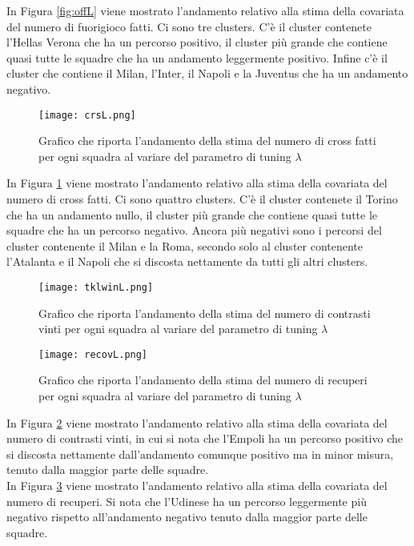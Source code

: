 In Figura \ref{fig:offL} viene mostrato l'andamento relativo alla stima della covariata del numero di fuorigioco fatti. Ci sono tre clusters. C'è il cluster contenete l'Hellas Verona che ha un percorso positivo, il cluster più grande che contiene quasi tutte le squadre che ha un andamento leggermente positivo. Infine c'è il cluster che contiene il Milan, l'Inter, il Napoli e la Juventus che ha un andamento negativo.

\begin{figure}[htbp]
	\begin{center}
		\texttt{[image: crsL.png]}
		\caption{Grafico che riporta l'andamento della stima del numero di cross fatti per ogni squadra al variare del parametro di tuning $\lambda$} \label{fig:crsL}
	\end{center}
\end{figure}

In Figura \ref{fig:crsL} viene mostrato l'andamento relativo alla stima della covariata del numero di cross fatti. Ci sono quattro clusters. C'è il cluster contenete il Torino che ha un andamento nullo, il cluster più grande che contiene quasi tutte le squadre che ha un percorso negativo. Ancora più negativi sono i percorsi del cluster contenente il Milan e la Roma, secondo solo al cluster contenente l'Atalanta e il Napoli che si discosta nettamente da tutti gli altri clusters.

\begin{figure}[htbp]
	\begin{center}
		\texttt{[image: tklwinL.png]}
		\caption{Grafico che riporta l'andamento della stima del numero di contrasti vinti per ogni squadra al variare del parametro di tuning $\lambda$} \label{fig:tklwinL}
	\end{center}
\end{figure}

\begin{figure}[htbp]
	\begin{center}
		\texttt{[image: recovL.png]}
		\caption{Grafico che riporta l'andamento della stima del numero di recuperi per ogni squadra al variare del parametro di tuning $\lambda$} \label{fig:recovL}
	\end{center}
\end{figure}
In Figura \ref{fig:tklwinL} viene mostrato l'andamento relativo alla stima della covariata del numero di contrasti vinti, in cui si nota che l'Empoli ha un percorso positivo che si discosta nettamente dall'andamento comunque positivo ma in minor misura, tenuto dalla maggior parte delle squadre.\\
In Figura \ref{fig:recovL} viene mostrato l'andamento relativo alla stima della covariata del numero di recuperi. Si nota che l'Udinese ha un percorso leggermente più negativo rispetto all'andamento negativo tenuto dalla maggior parte delle squadre.\\

